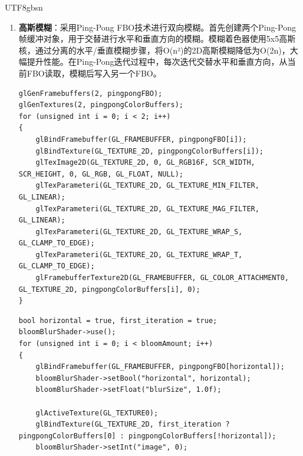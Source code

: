 \documentclass{article}
\begin{document}
\begin{CJK}{UTF8}{gbsn}
\begin{enumerate}
    \begin{lstlisting}[caption=亮度阈值着色器]
#version 330 core
out vec4 FragColor;

in vec2 TexCoords;

uniform sampler2D sceneTexture;
uniform float threshold;

void main()
{
    vec3 hdrColor = texture(sceneTexture, TexCoords).rgb;
    
    float brightness = dot(hdrColor, vec3(0.2126, 0.7152, 0.0722));
    
    vec3 result = hdrColor;
    if (brightness < threshold) {
        result = vec3(0.0);
    }
    
    FragColor = vec4(result, 1.0);
}
    \end{lstlisting}
    
    \item \textbf{高斯模糊}：采用Ping-Pong FBO技术进行双向模糊。首先创建两个Ping-Pong帧缓冲对象，用于交替进行水平和垂直方向的模糊。模糊着色器使用5x5高斯核，通过分离的水平/垂直模糊步骤，将O(n²)的2D高斯模糊降低为O(2n)，大幅提升性能。在Ping-Pong迭代过程中，每次迭代交替水平和垂直方向，从当前FBO读取，模糊后写入另一个FBO。

    \begin{lstlisting}[caption=Ping-Pong FBO创建]
glGenFramebuffers(2, pingpongFBO);
glGenTextures(2, pingpongColorBuffers);
for (unsigned int i = 0; i < 2; i++)
{
    glBindFramebuffer(GL_FRAMEBUFFER, pingpongFBO[i]);
    glBindTexture(GL_TEXTURE_2D, pingpongColorBuffers[i]);
    glTexImage2D(GL_TEXTURE_2D, 0, GL_RGB16F, SCR_WIDTH, SCR_HEIGHT, 0, GL_RGB, GL_FLOAT, NULL);
    glTexParameteri(GL_TEXTURE_2D, GL_TEXTURE_MIN_FILTER, GL_LINEAR);
    glTexParameteri(GL_TEXTURE_2D, GL_TEXTURE_MAG_FILTER, GL_LINEAR);
    glTexParameteri(GL_TEXTURE_2D, GL_TEXTURE_WRAP_S, GL_CLAMP_TO_EDGE);
    glTexParameteri(GL_TEXTURE_2D, GL_TEXTURE_WRAP_T, GL_CLAMP_TO_EDGE);
    glFramebufferTexture2D(GL_FRAMEBUFFER, GL_COLOR_ATTACHMENT0, GL_TEXTURE_2D, pingpongColorBuffers[i], 0);
}
    \end{lstlisting}

    \begin{lstlisting}[caption=高斯模糊Ping-Pong迭代实现]
bool horizontal = true, first_iteration = true;
bloomBlurShader->use();
for (unsigned int i = 0; i < bloomAmount; i++)
{
    glBindFramebuffer(GL_FRAMEBUFFER, pingpongFBO[horizontal]);
    bloomBlurShader->setBool("horizontal", horizontal);
    bloomBlurShader->setFloat("blurSize", 1.0f);
    
    glActiveTexture(GL_TEXTURE0);
    glBindTexture(GL_TEXTURE_2D, first_iteration ? pingpongColorBuffers[0] : pingpongColorBuffers[!horizontal]);
    bloomBlurShader->setInt("image", 0);
    

\end{lstlisting}
\end{enumerate}
\end{CJK}
\end{document}
